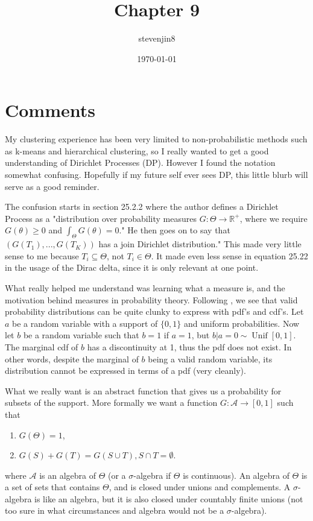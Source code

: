 \documentclass[a4paper,11pt]{article}
\title{Chapter 9}
\author{stevenjin8}
\date{\today}
\DeclareMathOperator*{\Unif}{Unif}
\begin{document}
  \maketitle

  \section*{Comments}
  My clustering experience has been very limited to non-probabilistic methods such as k-means and
  hierarchical clustering, so I really wanted to get a good understanding of Dirichlet Processes (DP).
  However I found the notation somewhat confusing. Hopefully if my future self ever sees DP, this
  little blurb will serve as a good reminder.

  The confusion starts in section 25.2.2 where the author defines a Dirichlet Process as a
  "distribution over probability measures $G : \Theta \rightarrow \mathbb{R}^+$, where we require
  $G(\theta) \geq 0$ and $\int_\Theta G(\theta) = 0$." He then goes on to say that $(G(T_1),...,G(T_K))$
  has a join Dirichlet distribution." This made very little sense to me because $T_i \subseteq \Theta$,
  not $T_i \in \Theta$. It made even less sense in equation 25.22 in the usage of the Dirac delta,
  since it is only relevant at one point.

  What really helped me understand was learning what a measure is, and the motivation behind
  measures in probability theory. Following \cite{prob-measure}, we see that valid probability
  distributions can be quite clunky to express with pdf's and cdf's. Let $a$ be a random variable
  with a support of $\{0, 1\}$ and uniform probabilities. Now let $b$ be a random variable such
  that $b=1$ if  $a=1$, but  $b|a=0 \sim \Unif[0,1]$. The marginal cdf of $b$ has a discontinuity at 1,
  thus the pdf does not exist. In other words, despite the marginal of $b$ being a valid random
  variable, its distribution cannot be expressed in terms of a pdf (very cleanly).

  What we really want is an abstract function that gives us a probability for subsets of the support.
  More formally we want a function $G: \mathcal{A} \rightarrow [0,1]$ such that
  \begin{enumerate}
    \item $G(\Theta) = 1$,
    \item $G(S) + G(T) = G(S \cup T), S \cap T = \emptyset$.
  \end{enumerate}
  where $\mathcal{A}$ is an algebra of $\Theta$ (or a $\sigma$-algebra if $\Theta$ is continuous).
  An algebra of $\Theta$ is a set of sets that contains $\Theta$, and is closed under unions and complements.
  A $\sigma$-algebra is like an algebra, but it is also closed under countably finite unions (not
  too sure in what circumstances and algebra would not be a $\sigma$-algebra).
\end{document}
